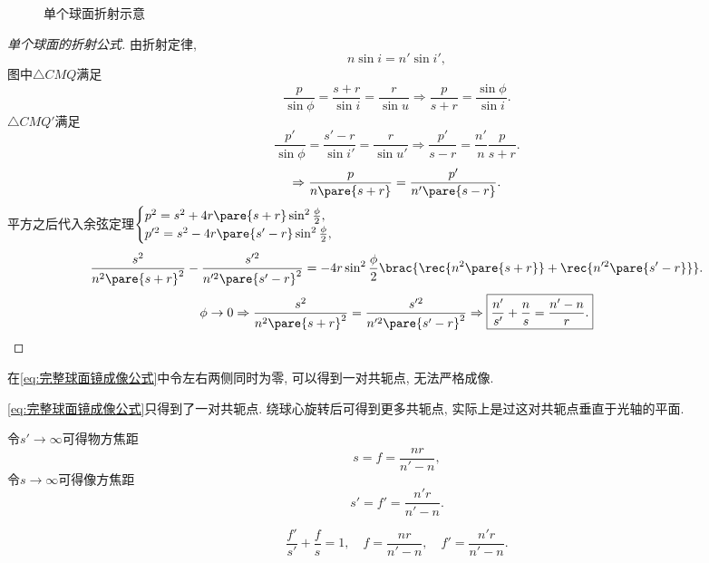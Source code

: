\documentclass{ctexart}
\begin{document}
\begin{figure}[ht]
    \centering
    \caption{单个球面折射示意}
    \label{fig:单个球面折射示意}
\end{figure}
\begin{proof}[单个球面的折射公式]
由折射定律,
\[ n\sin i = n'\sin i', \]
图中$\bigtriangleup CMQ$满足
\[ \frac{p}{\sin\phi} = \frac{s+r}{\sin i} = \frac{r}{\sin u} \Rightarrow \frac{p}{s+r} = \frac{\sin\phi}{\sin i}. \]
$\bigtriangleup CMQ'$满足
\[ \frac{p'}{\sin\phi} = \frac{s'-r}{\sin i'} = \frac{r}{\sin u'}\Rightarrow \frac{p'}{s-r} = \frac{n'}{n}\frac{p}{s+r}. \]
\[ \Rightarrow \frac{p}{n\pare{s+r}} = \frac{p'}{n'\pare{s-r}}. \]
平方之后代入余弦定理$\displaystyle \begin{cases}
    p^2 = s^2 + 4r\pare{s+r}\sin^2 \frac{\phi}{2},\\
    p'^2 = s^2 - 4r\pare{s'-r}\sin^2 \frac{\phi}{2},
\end{cases}$
\begin{equation}
    \label{eq:完整球面镜成像公式}
    \frac{s^2}{n^2\pare{s+r}^2} - \frac{s'^2}{n'^2\pare{s'-r}^2} = -4r\sin^2\frac{\phi}{2}\brac{\rec{n^2\pare{s+r}} + \rec{n'^2\pare{s'-r}}}. 
\end{equation}
\[ \phi\rightarrow 0\Rightarrow\frac{s^2}{n^2\pare{s+r}^2} = \frac{s'^2}{n'^2\pare{s'-r}^2} \Rightarrow \boxed{\frac{n'}{s'} + \frac{n}{s} = \frac{n'-n}{r}.} \qedhere \]
\end{proof}
\begin{remark}
    在\eqref{eq:完整球面镜成像公式}中令左右两侧同时为零, 可以得到一对共轭点, 无法严格成像.
\end{remark}
\begin{finale}
    \begin{remark}
        \eqref{eq:完整球面镜成像公式}只得到了一对共轭点. 绕球心旋转后可得到更多共轭点, 实际上是过这对共轭点垂直于光轴的平面.
    \end{remark}
\end{finale}
令$s'\rightarrow\infty$可得物方焦距
\[ s = f = \frac{nr}{n'-n}, \]
令$s\rightarrow\infty$可得像方焦距
\[ s' = f' = \frac{n'r}{n' - n}. \]
\begin{finale}
    \begin{theorem}[Gau\ss 公式]
        \[ \frac{f'}{s'} + \frac{f}{s} = 1,\quad f = \frac{nr}{n'-n},\quad f' = \frac{n'r}{n' - n}. \]
    \end{theorem}
\end{finale}
\setlength\extrarowheight{5pt}
\end{document}
